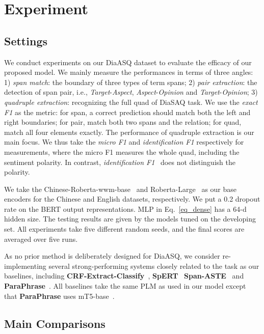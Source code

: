 \documentclass[11pt]{article}
\begin{document}
\section{Experiment}

\vspace{-2mm}
\subsection{Settings}

\vspace{-1mm}
We conduct experiments on our DiaASQ dataset to evaluate the efficacy of our proposed model.
We mainly measure the performances in terms of three angles:
1) \emph{span match}: the boundary of three types of term spans;
2) \emph{pair extraction}: the detection of span pair, i.e., \emph{Target}-\emph{Aspect}, \emph{Aspect}-\emph{Opinion} and \emph{Target}-\emph{Opinion};
3) \emph{quadruple extraction}: recognizing the full quad of DiaSAQ task.
We use the \emph{exact F1} as the metric: for span, a correct prediction should match both the left and right boundaries; for pair, match both two spans and the relation; for quad, match all four elements exactly.
The performance of quadruple extraction is our main focus.
We thus take the \emph{micro F1} and \emph{identification F1} respectively for measurements, where the micro F1 measures the whole quad, including the sentiment polarity.
In contrast, \emph{identification F1}~\cite{barnes-etal-2021-structured} does not distinguish the polarity.

We take the Chinese-Roberta-wwm-base~\cite{CuiCLQY21} and Roberta-Large~\cite{roberta-liu} as our base encoders for the Chinese and English datasets, respectively.
We put a 0.2 dropout rate on the BERT output representations.
MLP in Eq.~\eqref{eq_dense} has a 64-d hidden size.
The testing results are given by the models tuned on the developing set.
All experiments take five different random seeds, and the final scores are averaged over five runs.

As no prior method is deliberately designed for DiaASQ, we consider re-implementing several strong-performing systems closely related to the task as our baselines, including 
\textbf{CRF-Extract-Classify}~\cite{CaiXY20},
\textbf{SpERT}~\cite{EbertsU20}
\textbf{Span-ASTE}~\cite{XuCB20} and
\textbf{ParaPhrase}~\cite{ZhangD0YBL21}.
All baselines take the same PLM as used in our model except that \textbf{ParaPhrase} uses mT5-base~\cite{XueCRKASBR21}.

\subsection{Main Comparisons}
\end{document}
